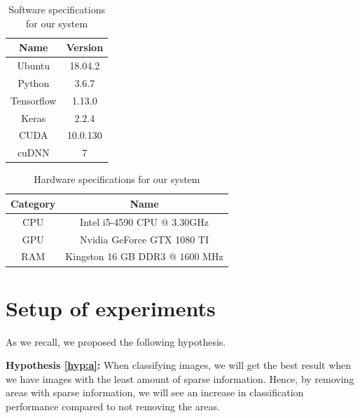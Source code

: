 \begin{table}[]
\centering
\begin{tabular}{@{}cc@{}}
\toprule
\multicolumn{1}{c}{Name} & \multicolumn{1}{c}{Version} \\ \midrule
Ubuntu                   & 18.04.2                 \\
Python                   & 3.6.7                       \\
Tensorflow               & 1.13.0                      \\
Keras                    & 2.2.4                       \\
CUDA                     & 10.0.130                    \\
cuDNN                    & 7                           \\ \bottomrule
\end{tabular}
\caption{Software specifications for our system}
\label{tab:SW}
\end{table}

\begin{table}[]
\centering
\begin{tabular}{@{}cc@{}}
\toprule
\multicolumn{1}{c}{Category} & \multicolumn{1}{c}{Name}       \\ \midrule
CPU                          & Intel i5-4590 CPU @ 3.30GHz    \\
GPU                          & Nvidia GeForce GTX 1080 TI     \\
RAM                          & Kingston 16 GB DDR3 @ 1600 MHz \\ \bottomrule
\end{tabular}
\caption{Hardware specifications for our system}
\label{tab:HW}
\end{table}


\section{Setup of experiments}
As we recall, we proposed the following hypothesis.
\vspace{10px}

\noindent
\textbf{Hypothesis \ref{hyp:a}:}
When classifying images, we will get the best result when we have images with the least amount of sparse information.
Hence, by removing areas with sparse information, we will see an increase in classification performance compared to not removing the areas.

